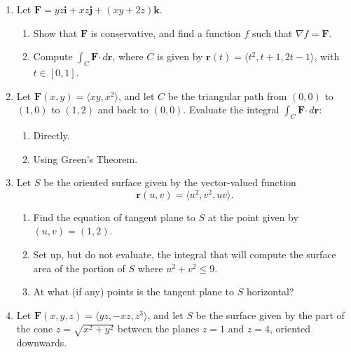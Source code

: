 \documentclass[12pt]{article}
\newcommand{\points}[1]{\marginpar{\hspace{24pt}[#1]}}
\newcommand{\dotp}{\boldsymbol{\cdot}}
\newcommand{\F}{\mathbf{F}}
\renewcommand{\i}{\mathbf{i}}
\renewcommand{\j}{\mathbf{j}}
\renewcommand{\k}{\mathbf{k}}
\renewcommand{\r}{\mathbf{r}}
\begin{document}
\begin{enumerate}
\item Let $\F = yz\i+xz\j+(xy+2z)\k$.
\begin{enumerate}
\item Show that $\F$ is conservative, and find a function $f$ such that $\nabla f=\F$. \points{5}

\vspace{5in}

\item Compute $\displaystyle \int_C \F\dotp \,d\r$, where $C$ is given by $\r(t) = \langle t^2,t+1,2t-1\rangle$, with $t\in [0,1]$.\points{5}
\end{enumerate}


\newpage

\item Let $\F(x,y) = \langle xy, x^2\rangle$, and let $C$ be the triangular path from $(0,0)$ to $(1,0)$ to $(1,2)$ and back to $(0,0)$. Evaluate the integral $\int_C \F\dotp \,d\r$:
\begin{enumerate}
\item Directly.\points{6}

\vspace{5in}

\item Using Green's Theorem.\points{4}

\end{enumerate}
\newpage


\item Let $S$ be the oriented surface given by the vector-valued function
\[
\r(u,v) = \langle u^2,v^2,uv\rangle.
\]
\begin{enumerate}
\item Find the equation of tangent plane to $S$ at the point given by $(u,v)=(1,2)$.\points{5}

\vspace{3.5in}

\item Set up, but do not evaluate, the integral that will compute the surface area of the portion of $S$ where $u^2+v^2\leq 9$. \points{3}

\vspace{2.75in}

\item At what (if any) points is the tangent plane to $S$ horizontal? \points{2}
\end{enumerate}

\newpage

\item Let $\F(x,y,z) = \langle yz, -xz, z^3\rangle$, and let $S$ be the surface given by the part of the cone $z = \sqrt{x^2+y^2}$ between the planes $z=1$ and $z=4$, oriented downwards.\points{10}


\end{enumerate}
\end{document}
